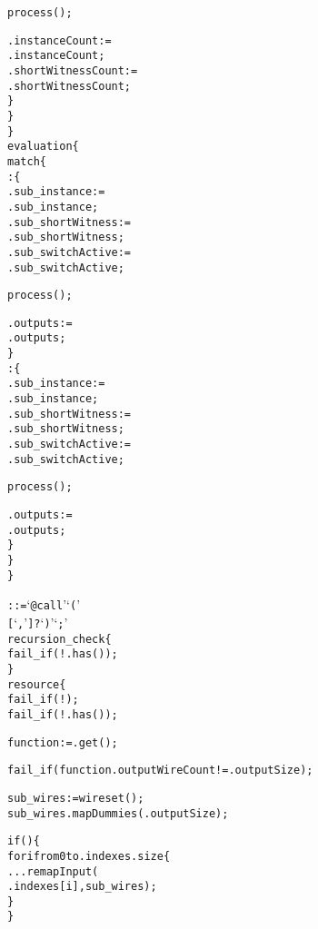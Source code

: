 \begin{alltt}
        process();

        .instanceCount :=
          .instanceCount;
        .shortWitnessCount :=
          .shortWitnessCount;
      \}
    \}
  \}
  evaluation \{
    match \{
      : \{
        .sub_instance :=
          .sub_instance;
        .sub_shortWitness :=
          .sub_shortWitness;
        .sub_switchActive :=
          .sub_switchActive;

        process();

        .outputs :=
          .outputs;
      \}
      : \{
        .sub_instance :=
          .sub_instance;
        .sub_shortWitness :=
          .sub_shortWitness;
        .sub_switchActive :=
          .sub_switchActive;

        process();

        .outputs :=
          .outputs;
      \}
    \}
  \}\ttSyn

   ::= `@call' `(' 
                           [ `,'  ]? `)' `;'\ttSem
  recursion_check \{
    fail_if(!.has());
  \}
  resource \{
    fail_if(!);
    fail_if(!.has());
    
    function := .get();
    
    fail_if(function.outputWireCount != .outputSize);
    
    sub_wires := wireset();
    sub_wires.mapDummies(.outputSize);
    
    if() \{
      for i from 0 to .indexes.size \{
        ...remapInput(
          .indexes[i], sub_wires);
      \}
    \}


\end{alltt}
